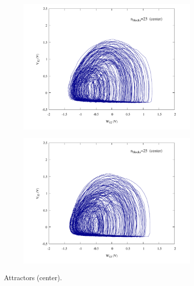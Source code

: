 \begin{figure}
\begin{minipage}{.47\textwidth}
\begin{subfigure}{\linewidth}
        \end{subfigure}
    \end{minipage}
    \begin{minipage}{.47\textwidth}
        \begin{subfigure}{\linewidth}
            \centering
            \includegraphics[width=\linewidth]
            {../blocks/23_blocks/middle/attractor.pdf}
        \end{subfigure}
    \end{minipage}
    \begin{minipage}{.47\textwidth}
        \begin{subfigure}{\linewidth}
            \centering
            \includegraphics[width=\linewidth]
            {../blocks/25_blocks/middle/attractor.pdf}
        \end{subfigure}
    \end{minipage}
    \caption{Attractors (center).}
    \label{fig:attractors 19-25 middle}
\end{figure}